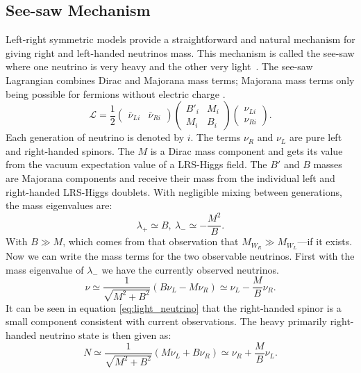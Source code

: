 \subsection{See-saw Mechanism}
\label{sec:seesaw}
Left-right symmetric models provide a straightforward and natural mechanism for giving right and left-handed neutrinos mass. This mechanism is called the see-saw where one neutrino is very heavy and the other very light~\cite{neutrino_mass}. The see-saw Lagrangian combines Dirac and Majorana mass terms; Majorana mass terms only being possible for fermions without electric charge \cite{Majorana:1937vz}. 
\begin{equation}\label{eq:seesaw}
  \mathcal{L} = \frac{1}{2}
  \begin{pmatrix}
    \bar{\nu}_{Li} & \bar{\nu}_{Ri}
  \end{pmatrix}
  \begin{pmatrix}
    B'_{i} & M_{i} \\
    M_{i} & B_{i} 
  \end{pmatrix}
  \begin{pmatrix}
    \nu_{Li} \\
    \nu_{Ri}
  \end{pmatrix}.
\end{equation}
Each generation of neutrino is denoted by $i$. The terms $\nu_{R}$ and $\nu_{L}$ are pure left and right-handed spinors.  The $M$ is a Dirac mass component and gets its value from the vacuum expectation value of a LRS-Higgs field.  The $B'$ and $B$ masses are Majorana components and receive their mass from the individual left and right-handed LRS-Higgs doublets. With negligible mixing between generations, the mass eigenvalues are:
\begin{equation}
    \lambda_{+} \simeq B ,\ 
    \lambda_{-} \simeq -\frac{M^{2}}{B}.
\end{equation}
With $B \gg M$, which comes from that observation that $M_{W_{R}} \gg M_{W_{L}}$---if it exists. Now we can write the mass terms for the two observable neutrinos.
First with the mass eigenvalue of $\lambda_{-}$ we have the currently observed neutrinos.
\begin{equation}
\label{eq:light_neutrino}
    \nu \simeq
    \frac{1}{\sqrt{M^{2}+B^{2}}}\left(B\nu_{L} - M\nu_{R}\right)\simeq
    \nu_{L}-\frac{M}{B}\nu_{R}.
\end{equation}
It can be seen in equation \ref{eq:light_neutrino} that the right-handed spinor is a small component consistent with current observations. The heavy primarily right-handed neutrino state is then given as:
\begin{equation}
    N \simeq
    \frac{1}{\sqrt{M^{2}+B^{2}}}\left(M\nu_{L} + B\nu_{R}\right)\simeq
    \nu_{R}+\frac{M}{B}\nu_{L}.
\end{equation}

